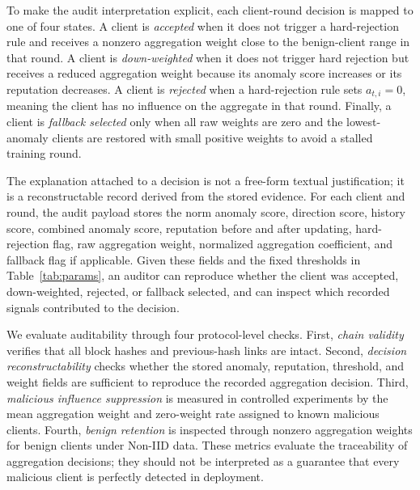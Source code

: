 \documentclass[preprint,12pt]{elsarticle}
\begin{document}
To make the audit interpretation explicit, each client-round decision is mapped to one of four states. A client is \emph{accepted} when it does not trigger a hard-rejection rule and receives a nonzero aggregation weight close to the benign-client range in that round. A client is \emph{down-weighted} when it does not trigger hard rejection but receives a reduced aggregation weight because its anomaly score increases or its reputation decreases. A client is \emph{rejected} when a hard-rejection rule sets $a_{t,i}=0$, meaning the client has no influence on the aggregate in that round. Finally, a client is \emph{fallback selected} only when all raw weights are zero and the lowest-anomaly clients are restored with small positive weights to avoid a stalled training round.

The explanation attached to a decision is not a free-form textual justification; it is a reconstructable record derived from the stored evidence. For each client and round, the audit payload stores the norm anomaly score, direction score, history score, combined anomaly score, reputation before and after updating, hard-rejection flag, raw aggregation weight, normalized aggregation coefficient, and fallback flag if applicable. Given these fields and the fixed thresholds in Table~\ref{tab:params}, an auditor can reproduce whether the client was accepted, down-weighted, rejected, or fallback selected, and can inspect which recorded signals contributed to the decision.

We evaluate auditability through four protocol-level checks. First, \emph{chain validity} verifies that all block hashes and previous-hash links are intact. Second, \emph{decision reconstructability} checks whether the stored anomaly, reputation, threshold, and weight fields are sufficient to reproduce the recorded aggregation decision. Third, \emph{malicious influence suppression} is measured in controlled experiments by the mean aggregation weight and zero-weight rate assigned to known malicious clients. Fourth, \emph{benign retention} is inspected through nonzero aggregation weights for benign clients under Non-IID data. These metrics evaluate the traceability of aggregation decisions; they should not be interpreted as a guarantee that every malicious client is perfectly detected in deployment.
\end{document}
